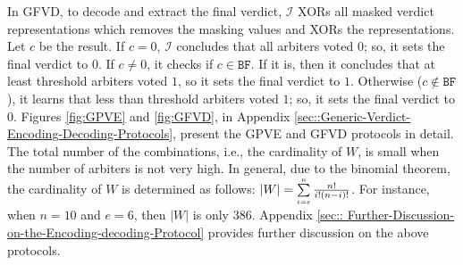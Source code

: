 In GFVD, to decode and extract the final verdict,  $\mathcal{I}$  XORs all masked verdict representations which  removes the masking values and XORs the representations. Let $c$ be the result.  If $c=0$,  $\mathcal{I}$ concludes that all arbiters  voted $0$; so, it sets the final verdict to $0$. If $c\neq 0$,  it checks if $c\in \mathtt{BF}$. If it is, then it concludes that at least threshold arbiters voted $1$, so it sets the final verdict to $1$. Otherwise ($c\notin \mathtt{BF}$), it learns that less than threshold arbiters voted $1$; so, it sets the final verdict to $0$.  Figures \ref{fig:GPVE} and \ref{fig:GFVD}, in Appendix \ref{sec::Generic-Verdict-Encoding-Decoding-Protocols}, present the  GPVE and GFVD protocols in detail. The total number of the combinations, i.e., the cardinality of $W$, is  small when the number of arbiters is not very high. In general,  due to the  binomial theorem, the cardinality of $W$ is determined as follows: $|W|=\sum\limits_{\scriptscriptstyle i=e}^{\scriptscriptstyle n}\frac{n!}{i!(n- i)!}$. 
%
 For instance, when $n=10$ and  $e=6$, then $|W|$ is only $386$. Appendix \ref{sec:: Further-Discussion-on-the-Encoding-decoding-Protocol} provides  further discussion on the above protocols.
 
 
% 
 
 
 
 

 
 




